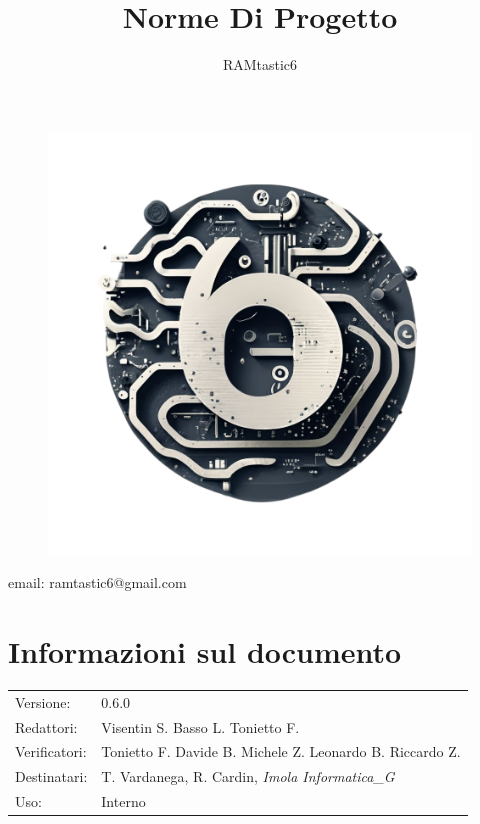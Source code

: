 \documentclass[12pt, oneside]{article}
\author{RAMtastic6}
\begin{document}
\thispagestyle{empty}
\title{Norme Di Progetto}
\maketitle
\begin{figure}[h]
  \centering
  \includegraphics[scale=0.3]{logo.png}
\end{figure}
\begin{center}
    email: ramtastic6@gmail.com
\end{center}

\section*{Informazioni sul documento}
\begin{tabular}{ll}
Versione: & 0.6.0 \\
Redattori: &  Visentin S.  Basso L. Tonietto F. \\
Verificatori: & Tonietto F. Davide B. Michele Z. Leonardo B. Riccardo Z. \\
Destinatari: & T. Vardanega, R. Cardin, \textit{Imola Informatica_G} \\
Uso: & Interno
\end{tabular}
\newpage
\end{document}
